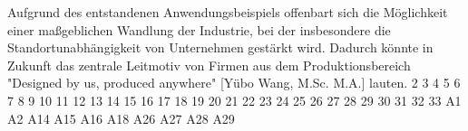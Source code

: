 \newline\newline
Aufgrund des entstandenen Anwendungsbeispiels offenbart sich die Möglichkeit einer maßgeblichen Wandlung der Industrie, bei der insbesondere die Standortunabhängigkeit von Unternehmen gestärkt wird. Dadurch könnte in Zukunft das zentrale Leitmotiv von Firmen aus dem Produktionsbereich "Designed by us, produced anywhere" [Yübo Wang, M.Sc. M.A.] lauten.
\newline\newline
\newline{} \cite{1}
2 \cite{2}
3 \cite{3}
4 %
5 \cite{5}
6 \cite{6}
7 \cite{7}
8 \cite{8}
9 \cite{9}
10 \cite{10}
11 \cite{11}
12 \cite{12}
13 \cite{13}
14 \cite{14}
15 \cite{15}
16 \cite{16}
17 \cite{17}
18 %
19 \cite{19}
20 \cite{20}
21 \cite{21}
22 \cite{22}
23 \cite{23}
24 \cite{24}
25 \cite{25}
26 \cite{26}
27 \cite{27}
28 \cite{28}
29 \cite{29}
30 \cite{30}
31 \cite{31}
32 \cite{32}
33 \cite{33}
A1 \cite{A1}
A2 \cite{A2}
A14 \cite{A14}
A15 \cite{A15}
A16 \cite{A16}
A18 \cite{A18}
A26 \cite{A26}
A27 \cite{A27}
A28 \cite{A28}
A29 \cite{A29}
